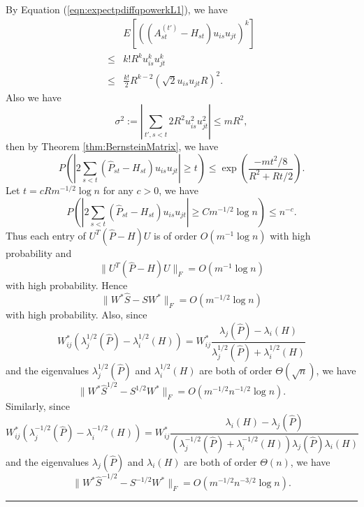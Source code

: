 \documentclass[a4paper]{article}
\newenvironment{proof}{{\bf Proof:  }}{\hfill\rule{2mm}{2mm}}
\begin{document}
\begin{proof}
By Equation (\ref{eqn:expectpdiffqpowerkL1}), we have
\begin{align*}
	& E\left[\left((A^{(t')}_{st} - H_{st}) u_{is} u_{jt}\right)^k\right] \\
    \le & k! R^k u_{is}^k u_{jt}^k \\
    \le & \frac{k!}{2} R^{k-2} (\sqrt{2} u_{is} u_{jt} R)^2.
\end{align*}
Also we have
\[
	\sigma^2 := |\sum_{t', s<t} 2 R^2 u_{is}^2 u_{jt}^2| \le m R^2,
\]
then by Theorem \ref{thm:BernsteinMatrix}, we have
\[
	P \left( \left| 2 \sum_{s<t} (\hat{P}_{st} - H_{st}) u_{is} u_{jt} \right| \ge t \right)
    \le \exp \left( \frac{-m t^2/8}{R^2 + R t /2} \right).
\]
Let $t = c R m^{-1/2} \log n$ for any $c > 0$, we have
\[
P \left( \left| 2 \sum_{s<t} (\hat{P}_{st} - H_{st}) u_{is} u_{jt} \right| \ge C m^{-1/2} \log n \right)
    \le n^{-c}.
\]
Thus each entry of $U^T(\hat{P} - H)U$ is of order $O(m^{-1} \log n)$ with high probability and
\begin{equation}
\label{eqn:uPhatdiffHuL1}
	\|U^T(\hat{P} - H)U\|_F = O(m^{-1} \log n)
\end{equation}
with high probability.
Hence
\[
	\| W^* \hat{S} - S W^* \|_F = O(m^{-1/2} \log n)
\]
with high probability.
Also, since
\[
	W_{ij}^* (\lambda_j^{1/2}(\hat{P}) - \lambda_i^{1/2}(H)) = W_{ij}^* \frac{\lambda_j(\hat{P}) - \lambda_i(H)}{\lambda_j^{1/2}(\hat{P}) + \lambda_i^{1/2}(H)}
\]
and the eigenvalues $\lambda_j^{1/2}(\hat{P})$ and $\lambda_i^{1/2}(H)$ are both of order $\Theta(\sqrt{n})$, we have
\[
	\| W^* \hat{S}^{1/2} - S^{1/2} W^* \|_F = O(m^{-1/2} n^{-1/2} \log n).
\]
Similarly, since
\[
	W_{ij}^* (\lambda_j^{-1/2}(\hat{P}) - \lambda_i^{-1/2}(H)) = W_{ij}^* \frac{\lambda_i(H) - \lambda_j(\hat{P})}{(\lambda_j^{-1/2}(\hat{P}) + \lambda_i^{-1/2}(H))\lambda_j(\hat{P}) \lambda_i(H)}
\]
and the eigenvalues $\lambda_j(\hat{P})$ and $\lambda_i(H)$ are both of order $\Theta(n)$, we have
\[
	\| W^* \hat{S}^{-1/2} - S^{-1/2} W^* \|_F = O(m^{-1/2} n^{-3/2} \log n).
\]
\end{proof}
\end{document}
